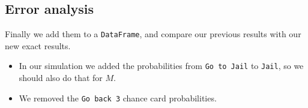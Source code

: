 \documentclass[11pt]{article}
\providecommand{\tightlist}{%
      \setlength{\itemsep}{0pt}\setlength{\parskip}{0pt}}
\begin{document}
    \hypertarget{error-analysis}{%
\subsection{Error analysis}\label{error-analysis}}

    Finally we add them to a \texttt{DataFrame}, and compare our previous
results with our new exact results.

\begin{itemize}
\tightlist
\item
  In our simulation we added the probabilities from
  \texttt{Go\ to\ Jail} to \texttt{Jail}, so we should also do that for
  \(M\).
\item
  We removed the \texttt{Go\ back\ 3} chance card probabilities.
\end{itemize}
\end{document}
